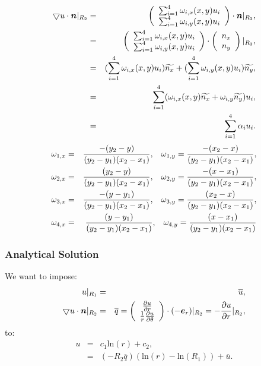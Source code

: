 \documentclass[a4paper,12pt]{article}
\newcommand{\mb}[1]{{\mbox{\boldmath$#1$\unboldmath}}}
\begin{document}
\begin{eqnarray}
\bigtriangledown u \cdot \mb{n}\vert_{R_2} &=& \left( \begin{array}{c}
 \sum_{i=1}^{4}\omega_{i,x}(x,y)u_i \\
 \sum_{i=1}^{4}\omega_{i,y}(x,y)u_i  \end{array} \right) \cdot \mb{n}\vert_{R_2},\\
&=& \left( \begin{array}{c}
 \sum_{i=1}^{4}\omega_{i,x}(x,y)u_i \\
 \sum_{i=1}^{4}\omega_{i,y}(x,y)u_i  \end{array} \right) \cdot\left(\begin{array}{c} n_x\\ n_y \end{array}\right) \vert_{R_2},\\
&=&  (\sum_{i=1}^{4}\omega_{i,x}(x,y)u_i) \widetilde{n_x} + (\sum_{i=1}^{4}\omega_{i,y}(x,y)u_i) \widetilde{n_y},\\
&=&\sum_{i=1}^{4}(\omega_{i,x}(x,y)\widetilde{n_x}+\omega_{i,y}\widetilde{n_y})u_i,\\
&=& \sum_{i=1}^4\alpha_iu_i.
\end{eqnarray}
\begin{eqnarray}
\omega_{1,x} &=& \frac{-(y_2 - y)}{(y_2 - y_1)(x_2 - x_1)}, \hspace{0.3cm}
\omega_{1,y} = \frac{-(x_2 - x)}{(y_2 - y_1)(x_2 - x_1)},\\
\omega_{2,x} &=& \frac{(y_2 - y)}{(y_2 - y_1)(x_2 - x_1)},\hspace{0.3cm}
\omega_{2,y} = \frac{-(x - x_1)}{(y_2 - y_1)(x_2 - x_1)},\\
\omega_{3,x} &=& \frac{-(y - y_1)}{(y_2 - y_1)(x_2 - x_1)},\hspace{0.3cm}
\omega_{3,y} = \frac{(x_2 - x)}{(y_2 - y_1)(x_2 - x_1)},\\
\omega_{4,x} &=& \frac{(y - y_1)}{(y_2 - y_1)(x_2 - x_1)},\hspace{0.3cm}
\omega_{4,y} = \frac{(x - x_1)}{(y_2 - y_1)(x_2 - x_1)}
\end{eqnarray}
\subsubsection{Analytical Solution}
We want to impose:
\begin{eqnarray}
u\vert_{R_1} &=& \overline{u},\\
\bigtriangledown u \cdot \mb{n}\vert_{R_2} &=& \overline{q} = \left( \begin{array}{c}
 \frac{\partial u}{\partial r} \\
 \frac{1}{r}\frac{\partial u}{\partial\theta} \end{array} \right)\cdot (-\mb{e}_r)\vert_{R_2} = -\frac{\partial u}{\partial r}\vert_{R_2},
\end{eqnarray}
to:
\begin{eqnarray}
 u &=& c_1\text{ln}(r) + c_2,\\
  &=& (-R_2\overline{q})( \text{ln}(r)- \text{ln}(R_1))+ \overline{u}.
\end{eqnarray}
\end{document}
